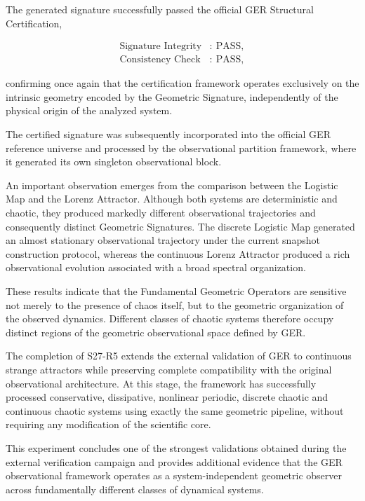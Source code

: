 The generated signature successfully passed the official GER Structural Certification,

\[
\begin{aligned}
\text{Signature Integrity} &:\ \mathrm{PASS},\\
\text{Consistency Check} &:\ \mathrm{PASS},
\end{aligned}
\]

confirming once again that the certification framework operates exclusively on the intrinsic geometry encoded by the Geometric Signature, independently of the physical origin of the analyzed system.

The certified signature was subsequently incorporated into the official GER reference universe and processed by the observational partition framework, where it generated its own singleton observational block.

An important observation emerges from the comparison between the Logistic Map and the Lorenz Attractor. Although both systems are deterministic and chaotic, they produced markedly different observational trajectories and consequently distinct Geometric Signatures. The discrete Logistic Map generated an almost stationary observational trajectory under the current snapshot construction protocol, whereas the continuous Lorenz Attractor produced a rich observational evolution associated with a broad spectral organization.

These results indicate that the Fundamental Geometric Operators are sensitive not merely to the presence of chaos itself, but to the geometric organization of the observed dynamics. Different classes of chaotic systems therefore occupy distinct regions of the geometric observational space defined by GER.

The completion of S27-R5 extends the external validation of GER to continuous strange attractors while preserving complete compatibility with the original observational architecture. At this stage, the framework has successfully processed conservative, dissipative, nonlinear periodic, discrete chaotic and continuous chaotic systems using exactly the same geometric pipeline, without requiring any modification of the scientific core.

This experiment concludes one of the strongest validations obtained during the external verification campaign and provides additional evidence that the GER observational framework operates as a system-independent geometric observer across fundamentally different classes of dynamical systems.

